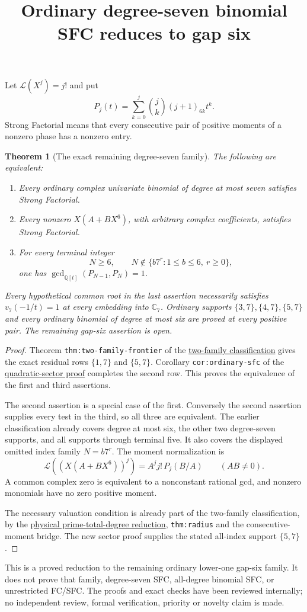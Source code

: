 \documentclass[11pt]{article}
\newtheorem{theorem}{Theorem}
\begin{document}
\title{Ordinary degree-seven binomial SFC reduces to gap six}
\author{}\date{}\maketitle
Let $\mathcal L(X^j)=j!$ and put
\[
 P_j(t)=\sum_{k=0}^j\binom jk(j+1)_{6k}t^k.
\]
Strong Factorial means that every consecutive pair of positive
moments of a nonzero phase has a nonzero entry.

\begin{theorem}[The exact remaining degree-seven family]
\label{thm:gap-six-frontier}
The following are equivalent:
\begin{enumerate}
\item Every ordinary complex univariate binomial of degree at most
seven satisfies Strong Factorial.
\item Every nonzero $X(A+BX^6)$, with arbitrary complex coefficients,
satisfies Strong Factorial.
\item For every terminal integer
\[
 N\ge6,\qquad N\notin\{b7^r:1\le b\le6,\ r\ge0\},
\]
one has $\gcd_{\mathbb Q[t]}(P_{N-1},P_N)=1$.
\end{enumerate}
Every hypothetical common root in the last assertion necessarily
satisfies $v_7(-1/t)=1$ at every embedding into $\mathbb C_7$.
Ordinary supports $\{3,7\},\{4,7\},\{5,7\}$ and every ordinary
binomial of degree at most six are proved at every positive pair.
The remaining gap-six assertion is open.
\end{theorem}
\begin{proof}
Theorem \texttt{thm:two-family-frontier} of the
\href{ORDINARY_DEGREE_SEVEN_TWO_FAMILY_FRONTIER.tex}{two-family classification}
gives the exact residual rows $\{1,7\}$ and $\{5,7\}$.
Corollary \texttt{cor:ordinary-sfc} of the
\href{LOWER_FIVE_QUADRATIC_SECTOR_SFC.tex}{quadratic-sector proof}
completes the second row. This proves the equivalence of the first
and third assertions.

The second assertion is a special case of the first.
Conversely the second assertion supplies every test in the third,
so all three are equivalent. The earlier classification already
covers degree at most six, the other two degree-seven supports,
and all supports through terminal five.
It also covers the displayed omitted index family $N=b7^r$.
The moment normalization is
\[
 \mathcal L((X(A+BX^6))^j)=A^j j!\,P_j(B/A)\qquad(AB\ne0).
\]
A common complex zero is equivalent to a nonconstant rational gcd,
and nonzero monomials have no zero positive moment.

The necessary valuation condition is already part of the two-family
classification, by the
\href{PHYSICAL_PRIME_TOTAL_DEGREE_REDUCTION.tex}{physical prime-total-degree reduction},
\texttt{thm:radius} and the consecutive-moment bridge.
The new sector proof supplies the stated all-index support $\{5,7\}$.
\end{proof}

This is a proved reduction to the remaining ordinary lower-one gap-six
family. It does not prove that family, degree-seven SFC, all-degree
binomial SFC, or unrestricted FC/SFC. The proofs and exact checks have
been reviewed internally; no independent review, formal verification,
priority or novelty claim is made.
\end{document}
